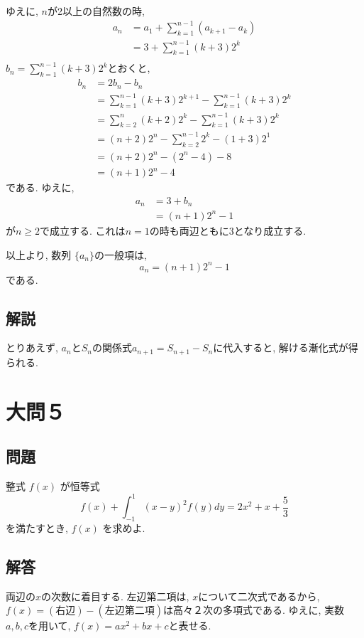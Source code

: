 \documentclass[dvipdfmx,a4paper]{jsarticle}
\newcommand{\2}{I\hspace{-1pt}I}
\newcommand{\3}{I\hspace{-1pt}I\hspace{-1pt}I}
\begin{document}
    ゆえに, $n$が2以上の自然数の時, 
    \begin{align*}
        a_n &= a_1 + \sum_{k=1}^{n-1} (a_{k+1} - a_k) \\
        &= 3 + \sum_{k=1}^{n-1} (k+3)2^k \\
    \end{align*}
    $\displaystyle b_n = \sum_{k=1}^{n-1} (k+3)2^k$とおくと, 
    \begin{align*}
        b_n &= 2b_n - b_n \\
        &= \sum_{k=1}^{n-1} (k+3)2^{k+1} - \sum_{k=1}^{n-1} (k+3)2^k \\
        &= \sum_{k=2}^{n} (k+2)2^{k} - \sum_{k=1}^{n-1} (k+3)2^k \\
        &= (n+2)2^n - \sum_{k=2}^{n-1} 2^{k} - (1+3)2^1 \\
        &= (n+2)2^n - (2^n-4) - 8 \\
        &= (n+1)2^n -4
    \end{align*}
    である. ゆえに, 
    \begin{align*}
        a_n &= 3 + b_n \\
        &= (n+1)2^n -1
    \end{align*}
    が$n \geq 2$で成立する. これは$n=1$の時も両辺ともに3となり成立する. 

    以上より, 数列 $\{a_n\}$の一般項は, 
    \begin{equation*}
        a_n= (n+1)2^n -1
    \end{equation*}
    である. 

    \subsection{解説}
    とりあえず, $a_n$と$S_n$の関係式$a_{n+1} = S_{n+1} - S_n$に代入すると, 
    解ける漸化式が得られる. 

    \section{大問５}
    \subsection{問題}
    整式 $f(x)$ が恒等式
    \begin{equation*}
        f(x) + \int_{-1}^1 (x-y)^2 f(y) dy = 2x^2 + x + \frac{5}{3}
    \end{equation*}
    を満たすとき, $f(x)$ を求めよ. 

    \subsection{解答}
    両辺の$x$の次数に着目する. 左辺第二項は, $x$について二次式であるから, 
    $f(x) = \mathrm{(右辺)} - \mathrm{(左辺第二項)}$は高々２次の多項式である. 
    ゆえに, 実数$a,b,c$を用いて, $f(x) = ax^2 + bx + c$と表せる. 
\end{document}
